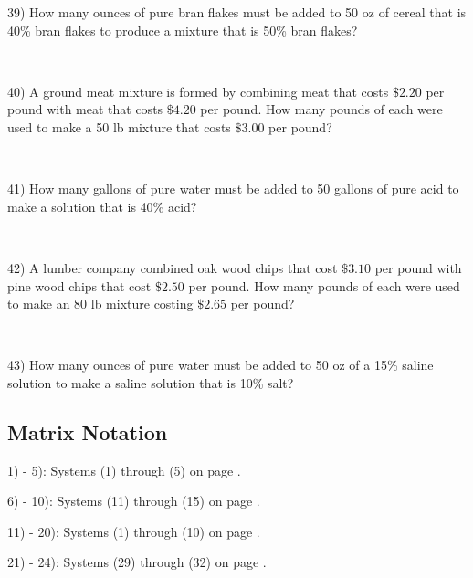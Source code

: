 39) How many ounces of pure bran flakes must be added to 50 oz of cereal that is 40\% bran flakes to produce a mixture that is 50\% bran
flakes?\par
~\par

40) A ground meat mixture is formed by combining meat that costs $\$2.20$ per pound with meat that costs
$\$4.20$ per pound. How many pounds of each were used to make a 50 lb mixture that costs $\$3.00$ per pound?\par
~\par

41) How many gallons of pure water must be added to 50 gallons of pure acid to make a solution that is 40\% acid?\par
~\par

42) A lumber company combined oak wood chips that cost $\$3.10$ per pound with pine wood chips that cost $\$2.50$ per pound.
How many pounds of each were used to make an 80 lb mixture
costing $\$2.65$ per pound?\par
~\par

43) How many ounces of pure water must be added to 50 oz of a 15\% saline solution to make a saline solution that is 10\% salt?

\newpage

\subsection{Matrix Notation}\par

{}\pp

1) - 5): Systems (1) through (5) on page \pageref{matrices1}.\pp

6) - 10): Systems (11) through (15) on page \pageref{matrices1}.\pp

11) - 20): Systems (1) through (10) on page \pageref{matrices2}.\pp

21) - 24): Systems (29) through (32) on page \pageref{matrices3}.%
